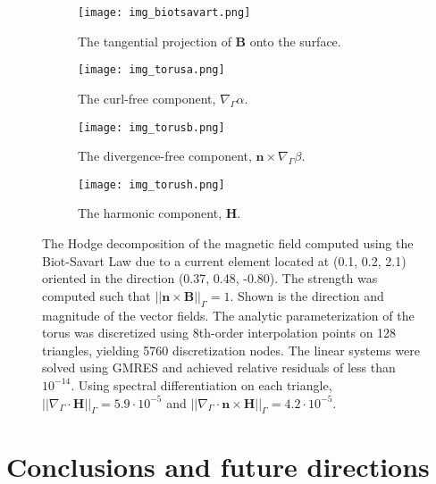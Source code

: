 \documentclass[11pt]{article}
\newcommand{\surfdiv}{\nabla_\Gamma \cdot}
\newcommand{\surfgrad}{\nabla_\Gamma}
\newcommand{\bn}{\bm n}
\newcommand{\bB}{\bm B}
\newcommand{\bH}{\bm H}
\numberwithin{equation}{section}
\begin{document}
\begin{figure}[!t]
  \begin{center}
    \begin{subfigure}[b]{.45\linewidth}
      \centering
      \texttt{[image: img\_biotsavart.png]}
      \caption{The tangential projection of $\bB$ onto the surface.}
      \label{fig_torus_biot}
    \end{subfigure}
    \quad
    \begin{subfigure}[b]{.45\linewidth}
      \centering
      \texttt{[image: img\_torusa.png]}
      \caption{The curl-free component, $\surfgrad \alpha$.}
      \label{fig_torusa}
    \end{subfigure}
    \begin{subfigure}[b]{.45\linewidth}
      \centering
      \texttt{[image: img\_torusb.png]}
      \caption{The divergence-free component, $\bn \times \surfgrad
        \beta$.}
      \label{fig_torusb}
    \end{subfigure}
    \quad
    \begin{subfigure}[b]{.45\linewidth}
      \centering
      \texttt{[image: img\_torush.png]}
      \caption{The harmonic component, $\bH$.}
      \label{fig_torush}
    \end{subfigure}
    \caption{The Hodge decomposition of the magnetic field computed
      using the Biot-Savart Law due to a current element located at
      (0.1, 0.2, 2.1) oriented in the direction (0.37, 0.48, -0.80). The
      strength was computed such that $||\bn \times \bB||_\Gamma = 1$.
      Shown is the direction and magnitude of the vector fields.
      The analytic parameterization of the torus was discretized using
      8th-order interpolation points on 128 triangles, yielding 5760
      discretization nodes. The linear systems were solved using GMRES
    and achieved relative residuals of less than $10^{-14}$. Using
    spectral differentiation on each triangle, $||\surfdiv
    \bH||_\Gamma = 5.9 \cdot 10^{-5}$ and $||\surfdiv \bn \times
    \bH||_\Gamma = 4.2 \cdot 10^{-5}$.}
    \label{fig_torus_harm}
  \end{center}
\end{figure}





\section{Conclusions and future directions}
\label{sec_conclusions}
\end{document}
